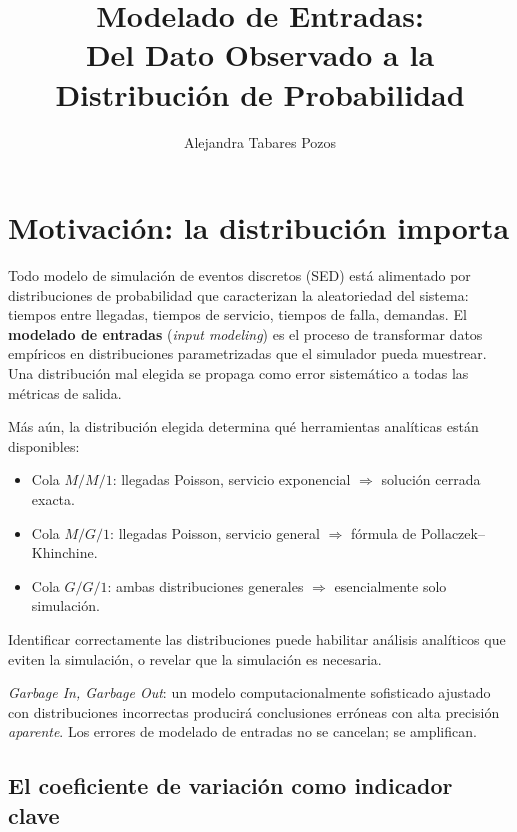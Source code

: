 \documentclass[11pt, letterpaper]{article}
\title{Modelado de Entradas:\\Del Dato Observado a la Distribución de Probabilidad}
\author{Alejandra Tabares Pozos}
\date{}
\begin{document}
\maketitle
\tableofcontents
\newpage

\section{Motivación: la distribución importa}

Todo modelo de simulación de eventos discretos (SED) está alimentado por distribuciones de probabilidad que caracterizan la aleatoriedad del sistema: tiempos entre llegadas, tiempos de servicio, tiempos de falla, demandas. El \textbf{modelado de entradas} (\emph{input modeling}) es el proceso de transformar datos empíricos en distribuciones parametrizadas que el simulador pueda muestrear. Una distribución mal elegida se propaga como error sistemático a todas las métricas de salida.

Más aún, la distribución elegida determina qué herramientas analíticas están disponibles:

\begin{itemize}
    \item Cola \textbf{$M/M/1$}: llegadas Poisson, servicio exponencial $\Rightarrow$ solución cerrada exacta.
    \item Cola \textbf{$M/G/1$}: llegadas Poisson, servicio general $\Rightarrow$ fórmula de Pollaczek--Khinchine.
    \item Cola \textbf{$G/G/1$}: ambas distribuciones generales $\Rightarrow$ esencialmente solo simulación.
\end{itemize}

Identificar correctamente las distribuciones puede habilitar análisis analíticos que eviten la simulación, o revelar que la simulación es necesaria.

\begin{alertabox}
\emph{Garbage In, Garbage Out}: un modelo computacionalmente sofisticado ajustado con distribuciones incorrectas producirá conclusiones erróneas con alta precisión \emph{aparente}. Los errores de modelado de entradas no se cancelan; se amplifican.
\end{alertabox}

\subsection{El coeficiente de variación como indicador clave}
\end{document}
